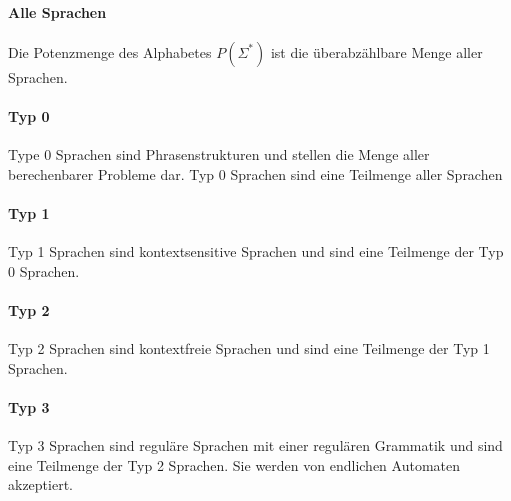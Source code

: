 \documentclass[../main.tex]{subfiles}
\begin{document}
            \paragraph{Alle Sprachen}
                Die Potenzmenge des Alphabetes $P(\Sigma^*)$ ist die überabzählbare Menge aller Sprachen.
            
            \paragraph{Typ 0}
                Type 0 Sprachen sind Phrasenstrukturen und stellen die Menge aller berechenbarer Probleme dar. Typ 0 Sprachen sind eine Teilmenge aller Sprachen
                
            \paragraph{Typ 1}
                Typ 1 Sprachen sind kontextsensitive Sprachen und sind eine Teilmenge der Typ 0 Sprachen.
                
            \paragraph{Typ 2}
                Typ 2 Sprachen sind kontextfreie Sprachen und sind eine Teilmenge der Typ 1 Sprachen.
                
            \paragraph{Typ 3}
                Typ 3 Sprachen sind reguläre Sprachen mit einer regulären Grammatik und sind eine Teilmenge der Typ 2 Sprachen. Sie werden von endlichen Automaten akzeptiert.
\end{document}
